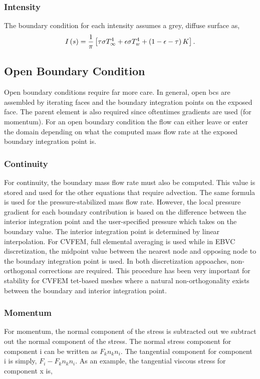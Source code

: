 \subsubsection{Intensity}
The boundary condition for each intensity assumes a grey, diffuse surface as, 
\begin{equation}
  I\left(s\right) = {1 \over \pi} \left[ \tau \sigma T_\infty^4 
                  + \epsilon \sigma T_w^4
                  + \left(1 - \epsilon - \tau \right) K \right].
\label{intBc}
\end{equation}

\subsection{Open Boundary Condition}
Open boundary conditions require far more care. In general,
open bcs are assembled by iterating faces and the boundary integration
points on the exposed face. The parent element is also required
since oftentimes gradients are used (for momentum). For an open boundary condition
the flow can either leave or enter the domain depending on what the computed mass
flow rate at the exposed boundary integration point is.

\subsubsection{Continuity}
For continuity, the boundary mass flow rate must also be computed. This value is stored and used
for the other equations that require advection. The same formula is used for the pressure-stabilized 
mass flow rate. However, the local pressure gradient
for each boundary contribution is based on the difference between the interior integration
point and the user-specified pressure which takes on the boundary value. The interior integration 
point is determined by linear interpolation. For CVFEM, full elemental averaging is used while in EBVC discretization,
the midpoint value between the nearest node and opposing node to the boundary integration point is used. In both
discretization appoaches, non-orthogonal corrections are required. This procedure has been very important for 
stability for CVFEM tet-based meshes where a natural non-orthogonality exists between the boundary and
interior integration point.

\subsubsection{Momentum}
For momentum, the normal component of the stress is subtracted out we subtract out the normal component of the stress. The normal stress
component for component i can be written as $F_k n_k n_i$. The tangential 
component for component i is simply, $F_i - F_k n_k n_i$. As an example, the tangential
viscous stress for component x is,

